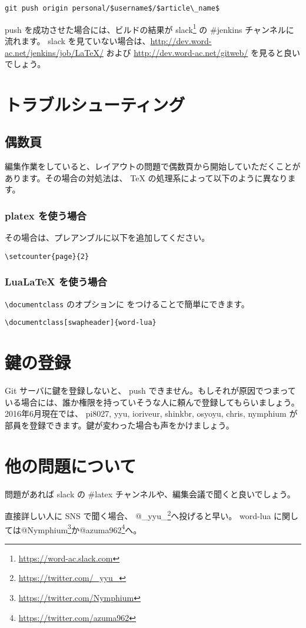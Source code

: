 \documentclass{word}
\begin{document}
\begin{lstlisting}[mathescape]
git push origin personal/$username$/$article\_name$
\end{lstlisting}

push を成功させた場合には、ビルドの結果が slack\footnote{\url{https://word-ac.slack.com}} の \#jenkins チャンネルに流れます。
slack を見ていない場合は、\url{http://dev.word-ac.net/jenkins/job/LaTeX/} および \url{http://dev.word-ac.net/gitweb/} を見ると良いでしょう。

\section{トラブルシューティング}

\subsection{偶数頁}

編集作業をしていると、レイアウトの問題で偶数頁から開始していただくことがあります。その場合の対処法は、 TeX の処理系によって以下のように異なります。

\subsubsection{platex を使う場合}

その場合は、プレアンブルに以下を追加してください。

\begin{lstlisting}[mathescape]
\setcounter{page}{2}
\end{lstlisting}

\subsubsection{LuaLaTeX を使う場合}

\lstinline|\documentclass| のオプションに  をつけることで簡単にできます。

\begin{lstlisting}[mathescape]
\documentclass[swapheader]{word-lua}
\end{lstlisting}

\section{鍵の登録}

Git サーバに鍵を登録しないと、 push できません。もしそれが原因でつまっている場合には、誰か権限を持っていそうな人に頼んで登録してもらいましょう。2016年6月現在では、
pi8027, yyu, ioriveur, shinkbr, osyoyu, chris, nymphium が部員を登録できます。鍵が変わった場合も声をかけましょう。

\section{他の問題について}

問題があれば slack の \#latex チャンネルや、編集会議で聞くと良いでしょう。

直接詳しい人に SNS で聞く場合、 @\_yyu\_\footnote{\url{https://twitter.com/_yyu_}}へ投げると早い。
word-lua に関しては@Nymphium\footnote{\url{https://twitter.com/Nymphium}}か@azuma962\footnote{\url{https://twitter.com/azuma962}}へ。
\end{document}
